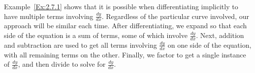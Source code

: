 
\afterex

Example~\ref{Ex:2.7.1} shows that it is possible when differentiating implicitly to have multiple terms involving $\frac{dy}{dx}$.  Regardless of the particular curve involved, our approach will be similar each time.  After differentiating, we expand so that each side of the equation is a sum of terms, some of which involve $\frac{dy}{dx}$.  Next, addition and subtraction are used to get all terms involving $\frac{dy}{dx}$ on one side of the equation, with all remaining terms on the other.   Finally, we factor to get a single instance of $\frac{dy}{dx}$, and then divide to solve for $\frac{dy}{dx}$.

